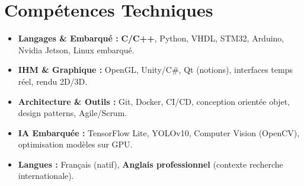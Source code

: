 \documentclass[a4paper,11pt]{article}
\begin{document}
\section{Compétences Techniques}
\begin{itemize}[leftmargin=*, nosep]
    \item \small{\textbf{Langages \& Embarqué :} \textbf{C/C++}, Python, VHDL, STM32, Arduino, Nvidia Jetson, Linux embarqué.}
    \item \small{\textbf{IHM \& Graphique :} OpenGL, Unity/C\#, Qt (notions), interfaces temps réel, rendu 2D/3D.}
    \item \small{\textbf{Architecture \& Outils :} Git, Docker, CI/CD, conception orientée objet, design patterns, Agile/Scrum.}
    \item \small{\textbf{IA Embarquée :} TensorFlow Lite, YOLOv10, Computer Vision (OpenCV), optimisation modèles sur GPU.}
    \item \small{\textbf{Langues :} Français (natif), \textbf{Anglais professionnel} (contexte recherche internationale).}
\end{itemize}

\end{document}
